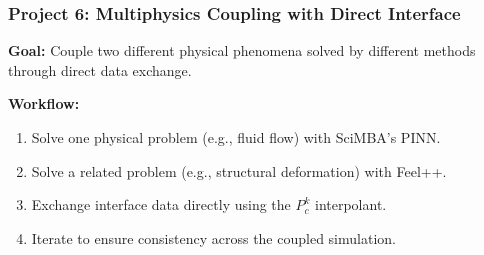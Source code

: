 \documentclass[11pt]{article}
\begin{document}
\subsubsection*{Project 6: Multiphysics Coupling with Direct Interface}
\textbf{Goal:}  
Couple two different physical phenomena solved by different methods through direct data exchange.

\textbf{Workflow:}
\begin{enumerate}[label=\arabic*.]
    \item Solve one physical problem (e.g., fluid flow) with SciMBA’s PINN.
    \item Solve a related problem (e.g., structural deformation) with Feel++.
    \item Exchange interface data directly using the \( P_c^k \) interpolant.
    \item Iterate to ensure consistency across the coupled simulation.
\end{enumerate}
\end{document}
